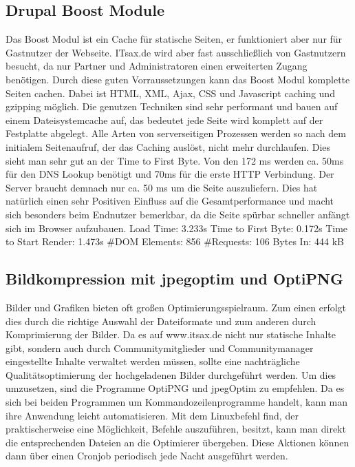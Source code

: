 \subsection{Drupal Boost Module} Das Boost Modul ist ein Cache für statische Seiten, er funktioniert aber nur für Gastnutzer der Webseite. ITsax.de wird aber fast ausschließlich von Gastnutzern besucht, da nur Partner und Administratoren einen erweiterten Zugang benötigen. Durch diese guten Vorraussetzungen kann das Boost Modul komplette Seiten cachen. Dabei ist HTML, XML, Ajax, CSS und Javascript caching und gzipping möglich. Die genutzen Techniken sind sehr performant und bauen auf einem Dateisystemcache auf, das bedeutet jede Seite wird komplett auf der Festplatte abgelegt. Alle Arten von serverseitigen Prozessen werden so nach dem initialem Seitenaufruf, der das Caching auslöst, nicht mehr durchlaufen. Dies sieht man sehr gut an der Time to First Byte. Von den 172 ms werden ca. 50ms für den DNS Lookup benötigt und 70ms für die erste HTTP Verbindung. Der Server braucht demnach nur ca. 50 ms um die Seite auszuliefern. Dies hat natürlich einen sehr Positiven Einfluss auf die Gesamtperformance und macht sich besonders beim Endnutzer bemerkbar, da die Seite spürbar schneller anfängt sich im Browser aufzubauen. 
Load Time: 3.233s
Time to First Byte: 0.172s %
Time to Start Render: 1.473s
\#DOM Elements: 856 	
\#Requests: 106 %
Bytes In: 444 kB

\subsection{Bildkompression mit jpegoptim und OptiPNG}
Bilder und Grafiken bieten oft großen Optimierungsspielraum. Zum einen erfolgt dies durch die richtige Auswahl der Dateiformate und zum anderen durch Komprimierung der Bilder. Da es auf www.itsax.de nicht nur statische Inhalte gibt, sondern auch durch Communitymitglieder und Communitymanager eingestellte Inhalte verwaltet werden müssen, sollte eine nachträgliche Qualitätsoptimierung der hochgeladenen Bilder durchgeführt werden. Um dies umzusetzen, sind die Programme OptiPNG und jpegOptim zu empfehlen. Da es sich bei beiden Programmen um Kommandozeilenprogramme handelt, kann man ihre Anwendung leicht automatisieren. Mit dem Linuxbefehl find, der praktischerweise eine Möglichkeit, Befehle auszuführen, besitzt, kann man direkt die entsprechenden Dateien an die Optimierer übergeben. Diese Aktionen können dann über einen Cronjob periodisch jede Nacht ausgeführt werden. 


